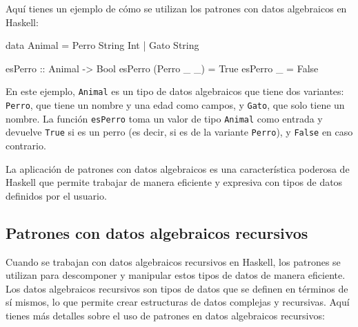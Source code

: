 \documentclass{article}
\begin{document}
Aquí tienes un ejemplo de cómo se utilizan los patrones con datos algebraicos en Haskell:

\begin{haskell}
data Animal = Perro String Int | Gato String

esPerro :: Animal -> Bool
esPerro (Perro _ _) = True
esPerro _ = False
\end{haskell}

En este ejemplo, \texttt{Animal} es un tipo de datos algebraicos que tiene dos variantes: \texttt{Perro}, que tiene un nombre y una edad como campos, y \texttt{Gato}, que solo tiene un nombre. La función \texttt{esPerro} toma un valor de tipo \texttt{Animal} como entrada y devuelve \texttt{True} si es un perro (es decir, si es de la variante \texttt{Perro}), y \texttt{False} en caso contrario.

La aplicación de patrones con datos algebraicos es una característica poderosa de Haskell que permite trabajar de manera eficiente y expresiva con tipos de datos definidos por el usuario.

\subsection{Patrones con datos algebraicos recursivos}

Cuando se trabajan con datos algebraicos recursivos en Haskell, los patrones se utilizan para descomponer y manipular estos tipos de datos de manera eficiente. Los datos algebraicos recursivos son tipos de datos que se definen en términos de sí mismos, lo que permite crear estructuras de datos complejas y recursivas. Aquí tienes más detalles sobre el uso de patrones en datos algebraicos recursivos:
\end{document}
